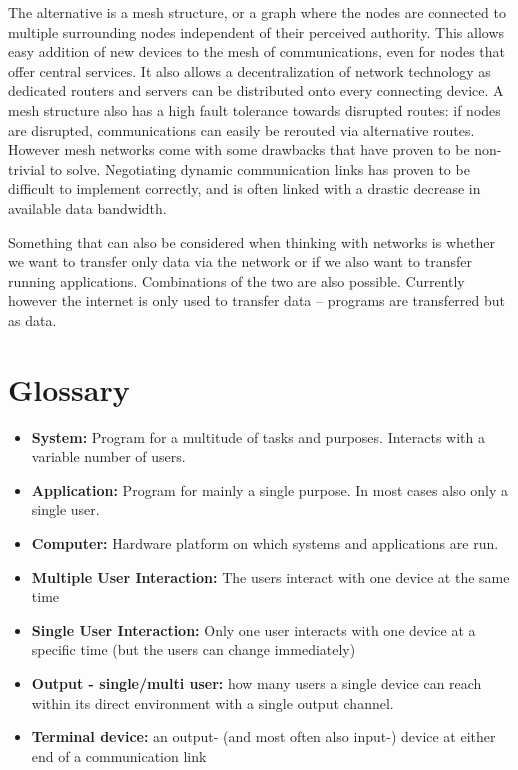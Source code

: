 \documentclass{acm_proc_article-sp}
\begin{document}
The alternative is a mesh structure, or a graph where the nodes are connected to multiple surrounding nodes independent of their perceived authority.
This allows easy addition of new devices to the mesh of communications, even for nodes that offer central services.
It also allows a decentralization of network technology as dedicated routers and servers can be distributed onto every connecting device.
A mesh structure also has a high fault tolerance towards disrupted routes: if nodes are disrupted, communications can easily be rerouted via alternative routes.
However mesh networks come with some drawbacks that have proven to be non-trivial to solve.
Negotiating dynamic communication links has proven to be difficult to implement correctly, and is often linked with a drastic decrease in available data bandwidth.

Something that can also be considered when thinking with networks is whether we want to transfer only data via the network or if we also want to transfer running applications.
Combinations of the two are also possible.
Currently however the internet is only used to transfer data – programs are transferred but as data.

\section{Glossary}

\begin{itemize}
\item \textbf{System:} Program for a multitude of tasks and purposes. Interacts with a variable number of users.
\item \textbf{Application:} Program for mainly a single purpose. In most cases also only a single user.
\item \textbf{Computer:} Hardware platform on which systems and applications are run.
\item \textbf{Multiple User Interaction:} The users interact with one device at the same time 
\item \textbf{Single User Interaction:} Only one user interacts with one device  at a specific time (but the users can change immediately)
\item \textbf{Output - single/multi user:} how many users a single device can reach within its direct environment with a single output channel.
\item \textbf{Terminal device:} an output- (and most often also input-) device at either end of a communication link
\end{itemize}

\balancecolumns
\end{document}
